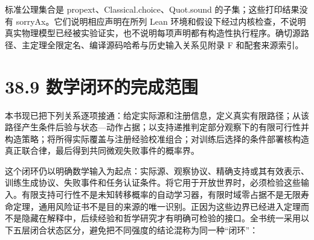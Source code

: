 \documentclass[
  11pt,
  oneside]{book}
\begin{document}
标准公理集合是 propext、Classical.choice、Quot.sound 的子集；这些打印结果没有 sorryAx。它们说明相应声明在所列 Lean 环境和假设下经过内核检查，不说明真实物理模型已经被实验证实，也不说明每项声明都有构造性执行程序。确切源路径、主定理全限定名、编译源码哈希与历史输入关系见附录 F 和配套来源索引。

\section{38.9 数学闭环的完成范围}\label{ux6570ux5b66ux95edux73afux7684ux5b8cux6210ux8303ux56f4}

本书现已把下列关系逐项接通：给定实际源和注册信息，定义真实有限路径；从该路径产生条件后验与状态---动作占据；以支持递推判定部分观察下的有限可行性并构造策略；将所得实际覆盖与注册经验校准组合；对训练后选择的条件部署核构造真正联合律，最后得到共同微观失败事件的概率界。

这个闭环仍以明确数学输入为起点：实际源、观察协议、精确支持或其有效表示、训练生成协议、失败事件和任务认证条件。将它用于开放世界时，必须检验这些输入。有限支持可行性不是未知转移概率的自动学习器，有限时域零占据不是无限寿命定理，通用风险证书不是目的来源的唯一识别。正因为这些边界已经进入定理而不是隐藏在解释中，后续经验和哲学研究才有明确可检验的接口。全书统一采用以下五层闭合状态区分，避免把不同强度的结论混称为同一种``闭环''：
\end{document}

